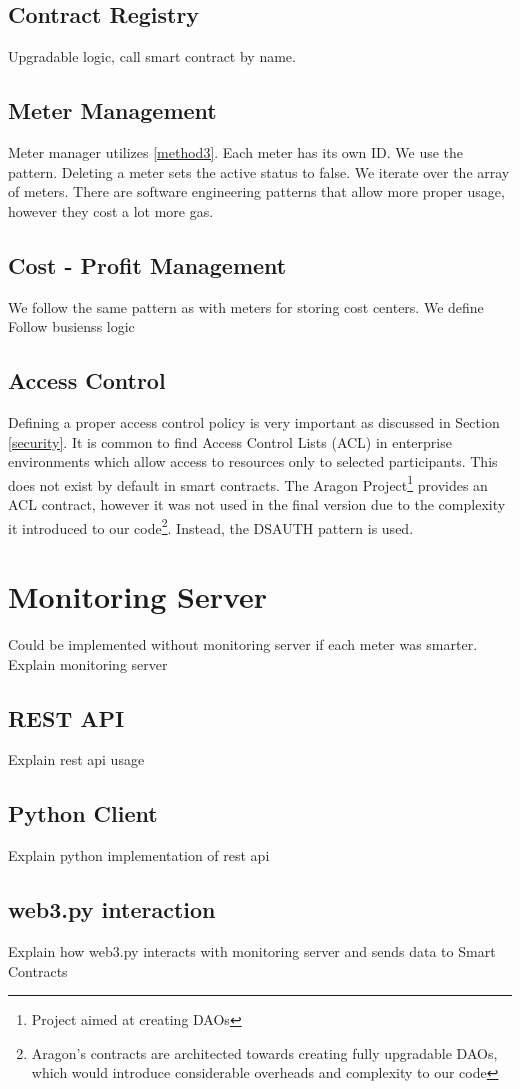 \subsection{Contract Registry}
Upgradable logic, call smart contract by name.

\subsection{Meter Management}
Meter manager utilizes \ref{method3}. Each meter has its own ID. We use the pattern. Deleting a meter sets the active status to false. We iterate over the array of meters. There are software engineering patterns \cite{crud} that allow more proper usage, however they cost a lot more gas. 

\subsection{Cost - Profit Management}
We follow the same pattern as with meters for storing cost centers. We define 
Follow busienss logic

\subsection{Access Control}
Defining a proper access control policy is very important as discussed in Section \ref{security}. It is common to find Access Control Lists (ACL) in enterprise environments which allow access to resources only to selected participants. This does not exist by default in smart contracts. The Aragon Project\footnote{Project aimed at creating DAOs} provides an ACL contract, however it was not used in the final version due to the complexity it introduced to our code\footnote{Aragon's contracts are architected towards creating fully upgradable DAOs, which would introduce considerable overheads and complexity to our code}. Instead, the DSAUTH pattern is used.

\section{Monitoring Server}
Could be implemented without monitoring server if each meter was smarter. 
Explain monitoring server

\subsection{REST API} 
Explain rest api usage 

\subsection{Python Client}
Explain python implementation of rest api

\subsection{web3.py interaction}
Explain how web3.py interacts with monitoring server and sends data to Smart Contracts

